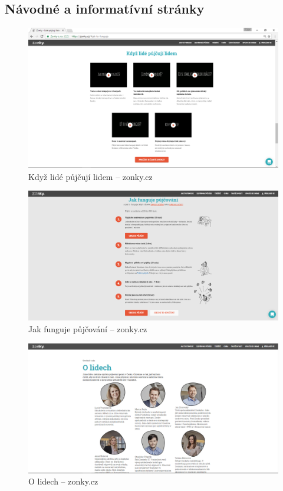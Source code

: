 
\newpage
\subsection{Návodné a informatívní stránky}
\begin{figure}[h]
    \centering
    \includegraphics[width=1.0\textwidth]{media/zonky/info.png}
    \caption{Když lidé půjčují lidem -- zonky.cz}
    \label{fig:zonky:info}
\end{figure}
\begin{figure}[h]
    \centering
    \includegraphics[width=1.0\textwidth]{media/zonky/info2.png}
    \caption{Jak funguje půjčování -- zonky.cz}
    \label{fig:zonky:info2}
\end{figure}
\begin{figure}[h]
    \centering
    \includegraphics[width=1.0\textwidth]{media/zonky/info3.png}
    \caption{O lidech -- zonky.cz}
    \label{fig:zonky:info3}
\end{figure}
